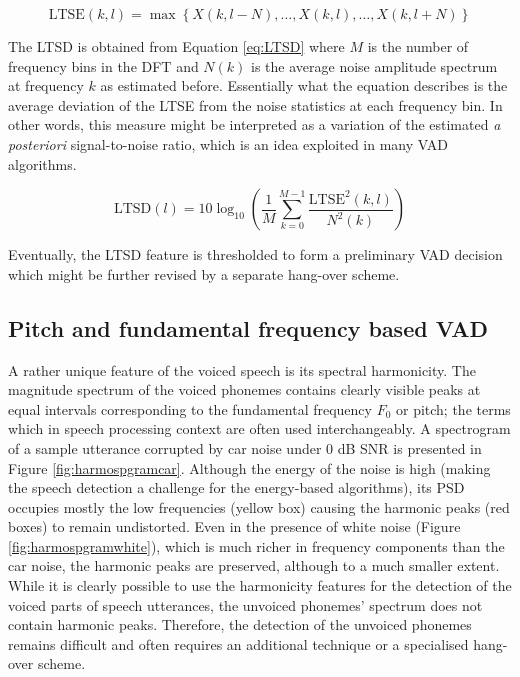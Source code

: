 \begin{equation}
\text{LTSE}(k,l) = \max \left \{ X(k,l-N),\ldots,X(k,l),\ldots,X(k,l+N) \right \}
\label{eq:LTSE}
\end{equation}

The LTSD is obtained from Equation \ref{eq:LTSD} where $M$ is the number of frequency bins in the DFT and $N(k)$ is the average noise amplitude spectrum at frequency $k$ as estimated before. Essentially what the equation describes is the average deviation of the LTSE from the noise statistics at each frequency bin. In other words, this measure might be interpreted as a variation of the estimated \emph{a posteriori} signal-to-noise ratio, which is an idea exploited in many VAD algorithms.

\begin{equation}
\text{LTSD}(l) = 10 \log_{10} \left ( \frac{1}{M} \sum_{k=0}^{M-1} \frac{\text{LTSE}^{2}(k,l)}{N^{2}(k)} \right )
\label{eq:LTSD}
\end{equation}

Eventually, the LTSD feature is thresholded to form a preliminary VAD decision which might be further revised by a separate hang-over scheme.

\subsection{Pitch and fundamental frequency based VAD}

A rather unique feature of the voiced speech is its spectral harmonicity. The magnitude spectrum of the voiced phonemes contains clearly visible peaks at equal intervals corresponding to the fundamental frequency $F_0$ or pitch; the terms which in speech processing context are often used interchangeably. A spectrogram of a sample utterance corrupted by car noise under 0 dB SNR is presented in Figure \ref{fig:harmospgramcar}. Although the energy of the noise is high (making the speech detection a challenge for the energy-based algorithms), its PSD occupies mostly the low frequencies (yellow box) causing the harmonic peaks (red boxes) to remain undistorted. Even in the presence of white noise (Figure \ref{fig:harmospgramwhite}), which is much richer in frequency components than the car noise, the harmonic peaks are preserved, although to a much smaller extent. While it is clearly possible to use the harmonicity features for the detection of the voiced parts of speech utterances, the unvoiced phonemes' spectrum does not contain harmonic peaks. Therefore, the detection of the unvoiced phonemes remains difficult and often requires an additional technique or a specialised hang-over scheme.


